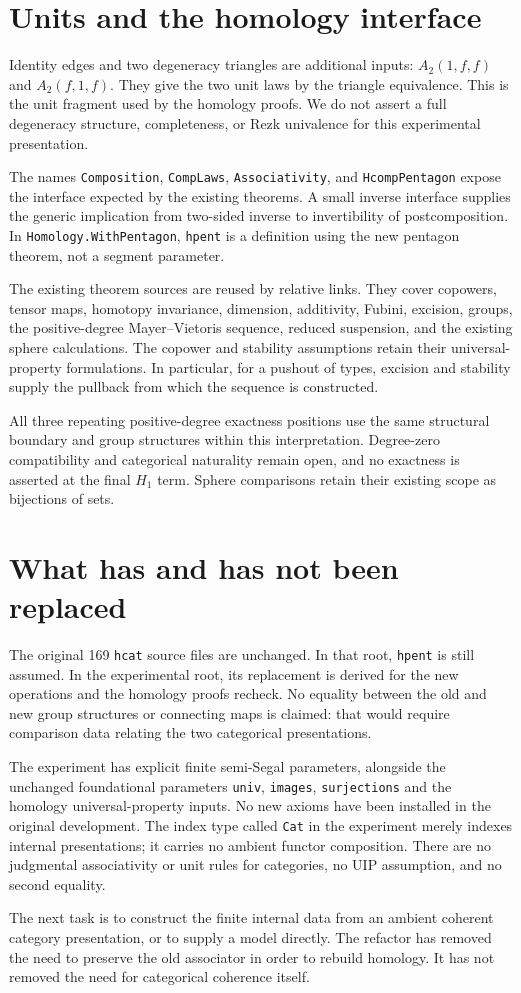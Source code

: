 \documentclass[11pt]{amsart}
\newcommand{\code}[1]{\nolinkurl{#1}}
\begin{document}
\section{Units and the homology interface}

Identity edges and two degeneracy triangles are additional inputs:
$A_2(1,f,f)$ and $A_2(f,1,f)$. They give the two unit laws by the
triangle equivalence. This is the unit fragment used by the homology
proofs. We do not assert a full degeneracy structure, completeness,
or Rezk univalence for this experimental presentation.

The names \code{Composition}, \code{CompLaws}, \code{Associativity},
and \code{HcompPentagon} expose the interface expected by the existing
theorems. A small inverse interface supplies the generic implication
from two-sided inverse to invertibility of postcomposition. In
\code{Homology.WithPentagon}, \code{hpent} is a definition using the
new pentagon theorem, not a segment parameter.

The existing theorem sources are reused by relative links. They cover
copowers, tensor maps, homotopy invariance, dimension, additivity,
Fubini, excision, groups, the positive-degree Mayer--Vietoris sequence,
reduced suspension, and the existing sphere calculations.
The copower and stability assumptions retain their universal-property
formulations. In particular, for a pushout of types, excision and
stability supply the pullback from which the sequence is constructed.

All three repeating positive-degree exactness positions use the same
structural boundary and group structures within this interpretation.
Degree-zero compatibility and categorical naturality remain open, and
no exactness is asserted at the final $H_1$ term. Sphere comparisons
retain their existing scope as bijections of sets.

\section{What has and has not been replaced}

The original 169 \code{hcat} source files are unchanged. In that root,
\code{hpent} is still assumed. In the experimental root, its replacement
is derived for the new operations and the homology proofs recheck.
No equality between the old and new group structures or connecting
maps is claimed: that would require comparison data relating the two
categorical presentations.

The experiment has explicit finite semi-Segal parameters, alongside
the unchanged foundational parameters \code{univ}, \code{images},
\code{surjections} and the homology universal-property inputs. No new
axioms have been installed in the original development. The index
type called \code{Cat} in the experiment merely indexes internal
presentations; it carries no ambient functor composition.
There are no judgmental associativity or unit rules for categories,
no UIP assumption, and no second equality.

The next task is to construct the finite internal data from an ambient
coherent category presentation, or to supply a model directly. The
refactor has removed the need to preserve the old associator in order
to rebuild homology. It has not removed the need for categorical
coherence itself.
\end{document}
